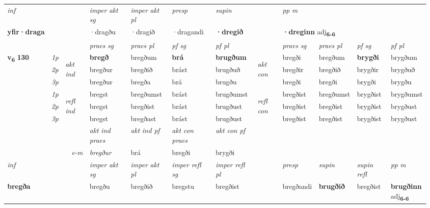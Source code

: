 \begin{longtable}[l]{X>{\footnotesize\itshape}llXXXXlXXXX}
   {\textit{inf}} & &  & \textit{imper akt sg} & \textit{imper akt pl}   & \textit{presp} & \textit{supin}  && \textit{pp m} \\*
  {\textbf{yfir\allowbreak ·draga}} & && ·dragðu  & ·dragið   & ·dragandi &  \textbf{·dregið}  && \multicolumn{2}{l}{\textbf{·dreginn} adj\textbf{\textsubscript{6-6}}} \\*

\midrule

 & &   & \textit{praes sg}  & \textit{praes pl}    & \textit{ pf sg} & \textit{pf pl} & & \textit{praes sg}  & \textit{praes pl}    & \textit{pf sg} & \textit{pf pl }  \\ \cmidrule{4-7} \cmidrule{9-12}
 \multirow{2}{*}{{{\textbf{v{\textsubscript{6}}} \Large{\textbf{130}}}}}  & 1p & \multirow{3}{*}{\begin{turn}{90}\textit{akt ind}\end{turn}} & \textbf{bregð} & bregðum & \textbf{brá} & \textbf{brugðum} & \multirow{3}{*}{\begin{turn}{90}\textit{akt con}\end{turn}} &bregði & bregðum & \textbf{brygði} & brygðum\\*
 & 2p &  &  bregður  & bregðið & brást & brugðuð & & bregðir & bregðið & brygðir & brygðuð \\*
 & 3p &  & bregður & bregða & brá & brugðu & & bregði & bregði& brygði & brygðu \\*
\cmidrule{4-7} \cmidrule{9-12}
 & 1p & \multirow{3}{*}{\begin{turn}{90}\textit{refl ind}\end{turn}}  & bregst & bregðumst & brást & brugðumst & \multirow{3}{*}{\begin{turn}{90}\textit{refl con}\end{turn}}  &bregðist & bregðumst & brygðist & brygðumst \\*
 & 2p &  & bregst & bregðist & brást & brugðust & &bregðist & bregðist & brygðist & brygðust \\*
 & 3p  & & bregst & bregðast & brást & brugðust & & bregðist & bregðist& brygðist & brygðust \\*
\cmidrule{4-7} \cmidrule{9-12}

   && &  \textit{akt ind praes} & \textit{akt ind pf} & \textit{akt con praes} & \textit{akt con pf} \\*
\multicolumn{3}{r}{\textit{e-m}} & bregður & brá & bregði & brygði \\*

\cmidrule{4-7}
   {\textit{inf}} & &  & \textit{imper akt sg} & \textit{imper akt pl} & \textit{imper refl sg} & \textit{imper refl pl} && \textit{presp} & \textit{supin} & \textit{supin refl} & \textit{pp m} \\*
  {\textbf{bregða}} & && bregðu  & bregðið & bregstu & bregðist && bregðandi &  \textbf{brugðið} & bregðist & \specialcell{\textbf{brugðinn} \\ adj\textbf{\textsubscript{6-6}}} \\*


\end{longtable}
